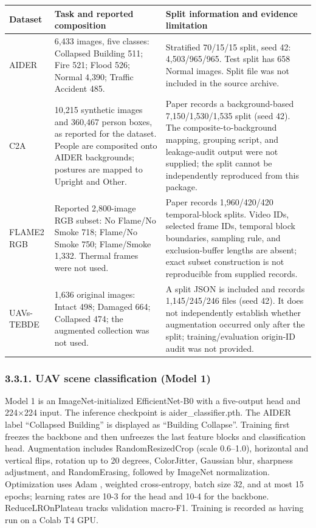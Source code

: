 \documentclass[pdflatex,sn-mathphys-ay]{sn-jnl}
\begin{document}
\begin{center}
\small
\renewcommand{\arraystretch}{1.15}
\setlength{\tabcolsep}{3pt}
\begin{tabularx}{\textwidth}{|X|X|X|}\hline
Dataset & Task and reported composition & Split information and evidence limitation \\ \hline
AIDER \cite{ref04} & 6,433 images, five classes: Collapsed Building 511; Fire 521; Flood 526; Normal 4,390; Traffic Accident 485. & Stratified 70/15/15 split, seed 42: 4,503/965/965. Test split has 658 Normal images. Split file was not included in the source archive. \\ \hline
C2A \cite{ref06} & 10,215 synthetic images and 360,467 person boxes, as reported for the dataset. People are composited onto AIDER backgrounds; postures are mapped to Upright and Other. & Paper records a background-based 7,150/1,530/1,535 split (seed 42). The composite-to-background mapping, grouping script, and leakage-audit output were not supplied; the split cannot be independently reproduced from this package. \\ \hline
FLAME2 RGB \cite{ref09} & Reported 2,800-image RGB subset: No Flame/No Smoke 718; Flame/No Smoke 750; Flame/Smoke 1,332. Thermal frames were not used. & Paper records 1,960/420/420 temporal-block splits. Video IDs, selected frame IDs, temporal block boundaries, sampling rule, and exclusion-buffer lengths are absent; exact subset construction is not reproducible from supplied records. \\ \hline
UAVs-TEBDE \cite{ref10} & 1,636 original images: Intact 498; Damaged 664; Collapsed 474; the augmented collection was not used. & A split JSON is included and records 1,145/245/246 files (seed 42). It does not independently establish whether augmentation occurred only after the split; training/evaluation origin-ID audit was not provided. \\ \hline
\end{tabularx}
\end{center}

\subsubsection*{3.3.1. UAV scene classification (Model 1)}

Model 1 is an ImageNet-initialized EfficientNet-B0 \cite{ref05} with a five-output head and 224$\times$224 input. The inference checkpoint is aider\_classifier.pth. The AIDER label ``Collapsed Building'' is displayed as ``Building Collapse''. Training first freezes the backbone and then unfreezes the last feature blocks and classification head. Augmentation includes RandomResizedCrop (scale 0.6--1.0), horizontal and vertical flips, rotation up to 20 degrees, ColorJitter, Gaussian blur, sharpness adjustment, and RandomErasing, followed by ImageNet normalization. Optimization uses Adam \cite{ref20}, weighted cross-entropy, batch size 32, and at most 15 epochs; learning rates are 10-3 for the head and 10-4 for the backbone. ReduceLROnPlateau tracks validation macro-F1. Training is recorded as having run on a Colab T4 GPU.
\end{document}
